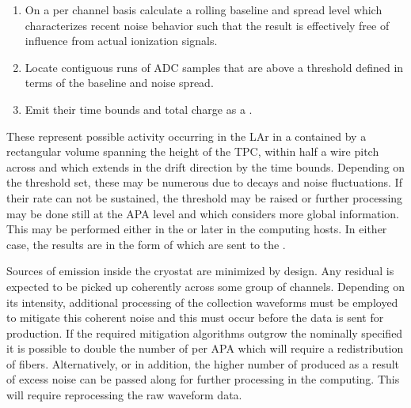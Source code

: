 \begin{enumerate}
\item On a per channel basis calculate a rolling baseline and spread
  level which characterizes recent noise behavior such that the result
  is effectively free of influence from actual ionization signals.
\item Locate contiguous runs of ADC samples that are above a threshold
  defined in terms of the baseline and noise spread.
\item Emit their time bounds and total charge as a .
\end{enumerate}

These  represent possible activity occurring in
the LAr in a contained by a rectangular volume spanning the height of
the TPC, within half a wire pitch across and which extends in the
drift direction by the time bounds. 
Depending on the threshold set, these  may be
numerous due to  decays and noise fluctuations.
If their rate can not be sustained, the threshold may be raised or
further processing may be done still at the APA level and which
considers more global information.
This may be performed either in the  or later in the
 computing hosts. 
In either case, the results are in the form of 
which are sent to the .

Sources of  emission inside the cryostat are minimized by
design. 
Any residual  is expected to be picked up coherently across
some group of channels. 
Depending on its intensity, additional processing of the collection
waveforms must be employed to mitigate this coherent noise and this
must occur before the data is sent for 
production. 
If the required mitigation algorithms outgrow the nominally specified
  it is possible to double the number of
 per APA which will require a redistribution of fibers. 
Alternatively, or in addition, the higher number of
 produced as a result of excess noise can be
passed along for further processing in the  computing. 
This will require reprocessing the raw waveform data.

